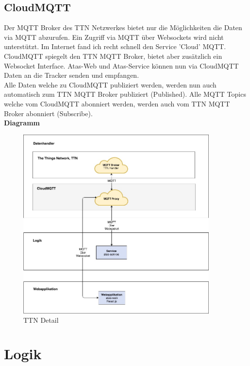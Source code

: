 \documentclass[11pt,english,german]{report}
\theoremstyle{definition}
\begin{document}
\subsection{CloudMQTT}
Der MQTT Broker des TTN Netzwerkes bietet nur die Möglichkeiten die Daten via MQTT abzurufen. Ein Zugriff via MQTT über Websockets wird nicht unterstützt. Im Internet fand ich recht schnell den Service 'Cloud' MQTT.   CloudMQTT spiegelt den TTN MQTT Broker, bietet aber zusätzlich ein Websocket Interface. Atas-Web und Atas-Service können nun via CloudMQTT Daten an die Tracker senden und empfangen.\\[0.3cm]
Alle Daten welche zu CloudMQTT publiziert werden, werden nun auch automatisch zum TTN MQTT Broker publiziert (Published). Alle MQTT Topics welche vom CloudMQTT abonniert werden, werden auch vom TTN MQTT Broker abonniert (Subscribe).  \\[0.3cm]
\textbf{Diagramm}
\begin{figure}[H]
	\centering
	\includegraphics[width=0.9\textwidth]{img/system/ATAS_SystemOverview_CloudMQTT_BA.jpg}
	\caption[TTN Detail]
	{TTN Detail}
\end{figure}

\newpage
\section{Logik}
\end{document}
